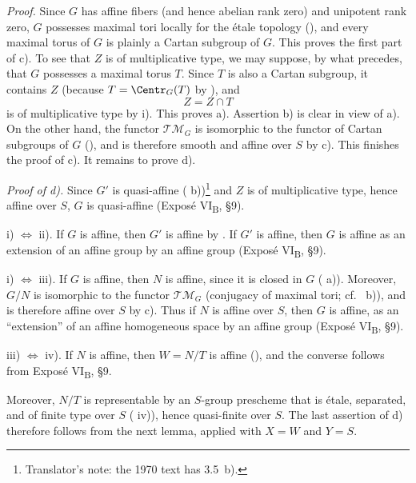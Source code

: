 \medskip
\noindent\textit{Proof.}
Since \(G\) has affine fibers (and hence abelian rank zero) and
unipotent rank zero, \(G\) possesses maximal tori locally for the
étale topology (), and every maximal torus of \(G\)
is plainly a Cartan subgroup of \(G\). This proves the first part
of c). To see that \(Z\) is of multiplicative type, we may suppose,
by what precedes, that \(G\) possesses a maximal torus \(T\).
Since \(T\) is also a Cartan subgroup, it contains \(Z\) (because
\(T=\Centr_G(T)\) by ), and
\[
  Z=Z\cap T
\]
is of multiplicative type by  i). This proves a). Assertion b)
is clear in view of a). On the other hand, the functor
\(\mathscr{TM}_G\) is isomorphic to the functor of Cartan
subgroups of \(G\) (), and is therefore smooth and
affine over \(S\) by  c). This finishes the proof of c). It
remains to prove d).

\medskip
\noindent\textit{Proof of d).}
Since \(G'\) is quasi-affine ( b))\footnote{Translator's note: the
1970 text has 3.5~b).} and \(Z\) is of
multiplicative type, hence affine over \(S\), \(G\) is quasi-affine
(Exposé VI\textsubscript{B}, \S9).

\medskip
\noindent i) \(\Longleftrightarrow\) ii).
If \(G\) is affine, then \(G'\) is affine by . If
\(G'\) is affine, then \(G\) is affine as an extension of an affine
group by an affine group (Exposé VI\textsubscript{B}, \S9).

\medskip
\noindent i) \(\Longleftrightarrow\) iii).
If \(G\) is affine, then \(N\) is affine, since it is closed in
\(G\) ( a)). Moreover, \(G/N\) is isomorphic to the
functor \(\mathscr{TM}_G\) (conjugacy of maximal tori; cf.\
 b)), and is therefore affine over \(S\) by c).
Thus if \(N\) is affine over \(S\), then \(G\) is affine, as an
``extension'' of an affine homogeneous space by an affine group
(Exposé VI\textsubscript{B}, \S9).

\medskip
\noindent iii) \(\Longleftrightarrow\) iv).
If \(N\) is affine, then \(W=N/T\) is affine (), and
the converse follows from Exposé VI\textsubscript{B}, \S9.

Moreover, \(N/T\) is representable by an \(S\)-group prescheme
that is étale, separated, and of finite type over \(S\) (\SGARefLink{sga3:xv:proposition:7-1}{Exposé XV,
7.1} iv)), hence quasi-finite over \(S\). The last assertion of d)
therefore follows from the next lemma, applied with \(X=W\) and
\(Y=S\).

